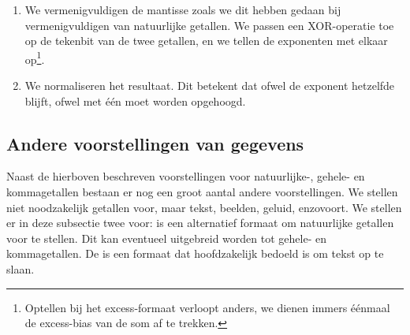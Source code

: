 \begin{enumerate}
 \item We vermenigvuldigen de mantisse zoals we dit hebben gedaan bij vermenigvuldigen van natuurlijke getallen. We passen een XOR-operatie toe op de tekenbit van de twee getallen, en we tellen de exponenten met elkaar op\footnote{Optellen bij het excess-formaat verloopt anders, we dienen immers \'e\'enmaal de excess-bias van de som af te trekken.}.
 \item We normaliseren het resultaat. Dit betekent dat ofwel de exponent hetzelfde blijft, ofwel met \'e\'en moet worden opgehoogd.
\end{enumerate}

\subsection{Andere voorstellingen van gegevens}
Naast de hierboven beschreven voorstellingen voor natuurlijke-, gehele- en kommagetallen bestaan er nog een groot aantal andere voorstellingen. We stellen niet noodzakelijk getallen voor, maar tekst, beelden, geluid, enzovoort. We stellen er in deze subsectie twee voor:  is een alternatief formaat om natuurlijke getallen voor te stellen. Dit kan eventueel uitgebreid worden tot gehele- en kommagetallen. De  is een formaat dat hoofdzakelijk bedoeld is om tekst op te slaan.

